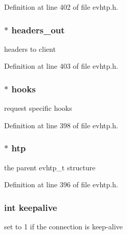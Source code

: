 \-Definition at line 402 of file evhtp.\-h.

\hypertarget{structevhtp__request__s_a139e220680f914ac7a44f3dac1b34be0}{
\subsubsection[{headers\-\_\-out}]{$\ast$ {\bf headers\-\_\-out}}}\label{structevhtp__request__s_a139e220680f914ac7a44f3dac1b34be0}
headers to client 

\-Definition at line 403 of file evhtp.\-h.

\hypertarget{structevhtp__request__s_ac97663394f74c9030e57c771cfb7981e}{
\subsubsection[{hooks}]{$\ast$ {\bf hooks}}}\label{structevhtp__request__s_ac97663394f74c9030e57c771cfb7981e}
request specific hooks 

\-Definition at line 398 of file evhtp.\-h.

\hypertarget{structevhtp__request__s_ad2f5cc5c9e97f75f1fe923c57af9e875}{
\subsubsection[{htp}]{$\ast$ {\bf htp}}}\label{structevhtp__request__s_ad2f5cc5c9e97f75f1fe923c57af9e875}
the parent evhtp\-\_\-t structure 

\-Definition at line 396 of file evhtp.\-h.

\hypertarget{structevhtp__request__s_ae314c4b48027be9feab52906b6313b73}{
\subsubsection[{keepalive}]{\setlength{\rightskip}{0pt plus 5cm}int {\bf keepalive}}}\label{structevhtp__request__s_ae314c4b48027be9feab52906b6313b73}
set to 1 if the connection is keep-\/alive 

